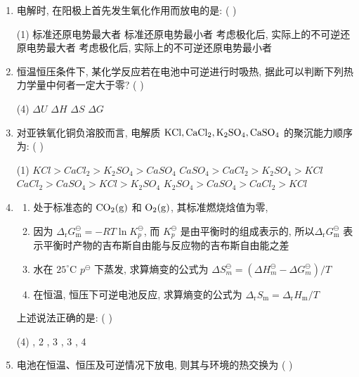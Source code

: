 \begin{enumerate}[label=\arabic*., itemsep=1.5ex]
    \item 电解时, 在阳极上首先发生氧化作用而放电的是: ( )
    \begin{tasks}(1)
        \task 标准还原电势最大者
        \task 标准还原电势最小者
        \task 考虑极化后, 实际上的不可逆还原电势最大者
        \task 考虑极化后, 实际上的不可逆还原电势最小者
    \end{tasks}
    \item 恒温恒压条件下, 某化学反应若在电池中可逆进行时吸热, 据此可以判断下列热力学量中何者一定大于零? ( )
    \begin{tasks}(4)
        \task $\Delta U$
        \task $\Delta H$
        \task $\Delta S$
        \task $\Delta G$
    \end{tasks}
    \item 对亚铁氧化铜负溶胶而言, 电解质 $\ce{KCl, CaCl_{2}, K_{2}SO_{4}, CaSO_{4}}$ 的聚沉能力顺序为: ( )
    \begin{tasks}(1)
        \task $KCl > CaCl_{2} > K_{2}SO_{4} > CaSO_{4}$
        \task $CaSO_{4} > CaCl_{2} > K_{2}SO_{4} > KCl$
        \task $CaCl_{2} > CaSO_{4} > KCl > K_{2}SO_{4}$
        \task $K_{2}SO_{4} > CaSO_{4} > CaCl_{2} > KCl$
    \end{tasks}
    \item
    \begin{enumerate}[label=(\arabic*), noitemsep, topsep=0pt, partopsep=0pt]
        \item 处于标准态的 $\ce{CO_{2}(g)}$ 和 $\ce{O_{2}(g)}$, 其标准燃烧焓值为零,
        \item 因为 $\Delta_\mathrm{r}G_\mathrm{m}^\ominus = -RT\ln K_p^\ominus$, 而 $K_p^\ominus$ 是由平衡时的组成表示的, 所以$\Delta_\mathrm{r}G_\mathrm{m}^\ominus$ 表示平衡时产物的吉布斯自由能与反应物的吉布斯自由能之差
        \item 水在 $25^\circ\mathrm{C}$ $p^\ominus$ 下蒸发, 求算熵变的公式为 $\Delta S_m^\ominus = (\Delta H_m^\ominus - \Delta G_m^\ominus)/T$
        \item 在恒温, 恒压下可逆电池反应, 求算熵变的公式为 $\Delta_\mathrm{r}S_\mathrm{m} = \Delta_\mathrm{r}H_\mathrm{m}/T$
    \end{enumerate}
    上述说法正确的是: ( )
    \begin{tasks}(4)
        , 2
        , 3
        , 3
        , 4
    \end{tasks}
    \item 电池在恒温、恒压及可逆情况下放电, 则其与环境的热交换为 ( )

\end{enumerate}
